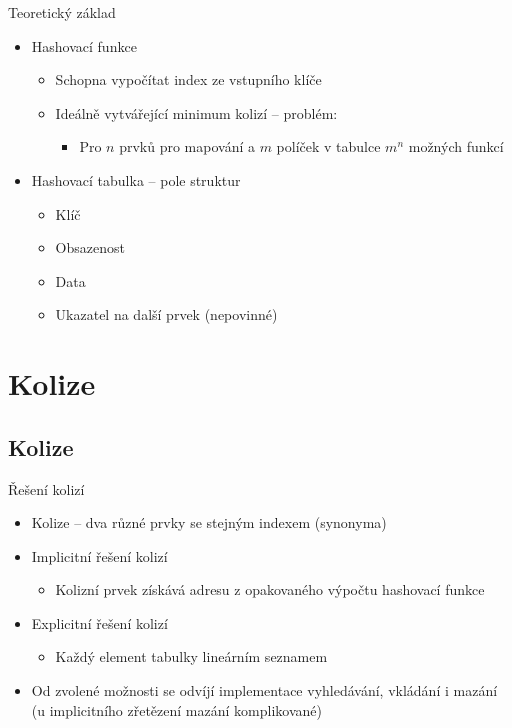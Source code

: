 \documentclass[14pt]{beamer}
\begin{document}
\begin{frame}{Teoretický základ}
    \begin{itemize}
        \item Hashovací funkce
        \begin{itemize}
            \item Schopna vypočítat index ze vstupního klíče
            \item Ideálně vytvářející minimum kolizí -- problém:
            \begin{itemize}
                \item Pro $n$ prvků pro mapování a $m$ políček v tabulce $m^n$ možných funkcí
            \end{itemize}
        \end{itemize}
        \item Hashovací tabulka -- pole struktur
        \begin{itemize}
            \item Klíč
            \item Obsazenost
            \item Data
            \item Ukazatel na další prvek (nepovinné)
        \end{itemize}
    \end{itemize}
\end{frame}
\section{Kolize}
\subsection{Kolize}
\begin{frame}{Řešení kolizí}
    \begin{itemize}
        \item Kolize -- dva různé prvky se stejným indexem (synonyma)
        \item Implicitní řešení kolizí
        \begin{itemize}
            \item Kolizní prvek získává adresu z opakovaného výpočtu hashovací funkce
        \end{itemize}
        \item Explicitní řešení kolizí
        \begin{itemize}
            \item Každý element tabulky lineárním seznamem
        \end{itemize}
        \item Od zvolené možnosti se odvíjí implementace vyhledávání, vkládání i mazání (u implicitního zřetězení mazání komplikované)
    \end{itemize}
\end{frame}
\end{document}
